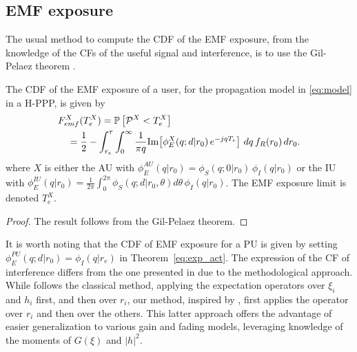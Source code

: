 \subsection{EMF exposure}
The usual method to compute the CDF of the EMF exposure, from the knowledge of the CFs of the useful signal and interference, is to use the Gil-Pelaez theorem \cite{gil-pelaez}.
\begin{theorem}\label{eq:exp_act}
    The CDF of the EMF exposure of a user, for the propagation model in \eqref{eq:model} in a H-PPP, is given by
\begin{align*}
    &F_{emf}^{X}(T_{e}^X) = \mathbb{P}\left[\mathcal{P}^{X} < T_{e}^{X}\right]\\
    &\quad= \frac{1}{2}-\int_{r_e}^{\tau}\int_{0}^{\infty} \frac{1}{\pi q}\textrm{\normalfont Im}\!\left[\phi_E^{X}(q;d|r_0)\,e^{-jqT_{e}}\right]\,dq \, f_R(r_0)\,dr_0.
\end{align*}where $X$ is either the AU with $\phi_E^{AU}(q|r_0)\! = \!\phi_{S}(q;0|r_0)\,\phi_{I}(q|r_0)$ or the IU with $\phi_E^{IU}(q|r_0)\! =\! \frac{1}{2\pi} \int_{0}^{2\pi}\!\phi_{S}(q;d|r_0,\theta)d\theta \,\phi_{I}(q|r_0)$. The EMF exposure limit is denoted $T_e^X$.
\end{theorem}
\begin{proof}
    The result follows from the Gil-Pelaez theorem.
\end{proof}
It is worth noting that the CDF of EMF exposure for a PU is given by setting $\phi_E^{PU}(q;d|r_0)\! = \!\phi_{I}(q|r_e)$ in Theorem~\ref{eq:exp_act}. The expression of the CF of interference differs from the one presented in \cite{GontierMeta} due to the methodological approach. While \cite{GontierMeta} follows the classical method, applying the expectation operators over $\xi_i$ and $h_i$ first, and then over $r_i$, our method, inspired by \cite{yu2017}, first applies the operator over $r_i$ and then over the others. This latter approach offers the advantage of easier generalization to various gain and fading models, leveraging knowledge of the moments of $G(\xi)$ and $|h|^2$.


